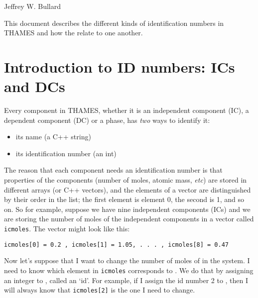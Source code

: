 \documentclass{article}
\begin{document}
\lstset{language=C++,stringstyle=\ttfamily}

\begin{center}
    \Large{\textbf{}}
\end{center}
\begin{center}
    \large{Jeffrey W. Bullard}
\end{center}
\begin{center}
    \large{\DTMnow}
\end{center}

\vspace{0.25truein}
\tableofcontents

\vspace{0.25truein}
This document describes the different kinds of identification numbers in THAMES
and how the relate to one another.

\section{Introduction to ID numbers: ICs and DCs}
Every component in THAMES, whether it is an independent component (IC), a dependent
component (DC) or a phase, has \textit{two} ways to identify it:
\begin{itemize}
    \item its name (a C++ string)
    \item its identification number (an int)
\end{itemize}
The reason that each component needs an identification number is that properties of the
components (number of moles, atomic mass, \textit{etc}) are stored in different
arrays (or C++ vectors), and the elements of a vector are distinguished by their order
in the list; the first element is element 0, the second is 1, and so on.
So for example, suppose we have nine independent components (ICs) and we are
storing the number of moles of the independent components
in a vector called \verb!icmoles!. The vector might look like this:

\begin{verbatim}
icmoles[0] = 0.2 , icmoles[1] = 1.05, . . . , icmoles[8] = 0.47
\end{verbatim}

Now let's suppose that I want to change the number of moles of  in the system.
I need to know which element in \verb!icmoles! corresponds to .  We do that
by assigning an integer to , called an `id'.  For example, if I assign
the id number 2 to , then I will always know that \verb!icmoles[2]! is the one
I need to change.
\end{document}
